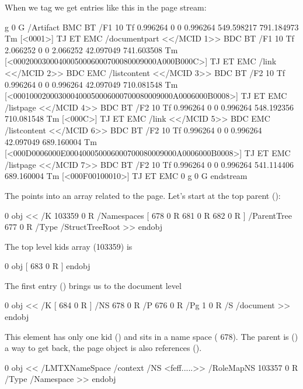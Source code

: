 \page

When we tag we get entries like this in the page stream:

\startcolumns[distance=1cm]
 g 0 G
/Artifact BMC
BT
/F1 10 Tf
0.996264 0 0 0.996264 549.598217 791.184973 Tm [<0001>] TJ
ET
EMC
/documentpart <</MCID 1>> BDC
BT
/F1 10 Tf
2.066252 0 0 2.066252 42.097049 741.603508 Tm [<00020003000400050006000700080009000A000B000C>] TJ
ET
EMC
/link <</MCID 2>> BDC
EMC
/listcontent <</MCID 3>> BDC
BT
/F2 10 Tf
0.996264 0 0 0.996264 42.097049 710.081548 Tm [<000100020003000400050006000700080009000A0006000B0008>] TJ
ET
EMC
/listpage <</MCID 4>> BDC
BT
/F2 10 Tf
0.996264 0 0 0.996264 548.192356 710.081548 Tm [<000C>] TJ
ET
EMC
/link <</MCID 5>> BDC
EMC
/listcontent <</MCID 6>> BDC
BT
/F2 10 Tf
0.996264 0 0 0.996264 42.097049 689.160004 Tm [<000D0006000E000400050006000700080009000A0006000B0008>] TJ
ET
EMC
/listpage <</MCID 7>> BDC
BT
/F2 10 Tf
0.996264 0 0 0.996264 541.114406 689.160004 Tm [<000F00100010>] TJ
ET
EMC
0 g 0 G
endstream
\stoptyping
\stopcolumns

\page

The  points into an array related to the page. Let's start at
the top parent ():

 0 obj
    <<
        /K          103359 0 R
        /Namespaces [ 678 0 R 681 0 R 682 0 R ]
        /ParentTree 677 0 R
        /Type       /StructTreeRoot
    >>
endobj
\stoptyping

The top level kids array (103359) is

 0 obj
[ 683 0 R ]
endobj
\stoptyping

The first entry () brings us to the document level

 0 obj
    <<
        /K  [ 684 0 R ]
        /NS 678 0 R
        /P  676 0 R
        /Pg 1 0 R
        /S  /document
    >>
endobj
\stoptyping

\page

This element has only one kid () and sits in a name space (\type
{678}). The parent is () a way to get back, the page object is also
references ().

 0 obj
    <<
        /LMTXNameSpace /context
        /NS            <feff.....>>
        /RoleMapNS     103357 0 R
        /Type          /Namespace
    >>
endobj
\stoptyping

